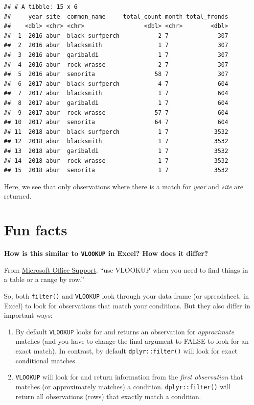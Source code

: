\documentclass[]{book}
\begin{document}
\begin{verbatim}
## # A tibble: 15 x 6
##     year site  common_name     total_count month total_fronds
##    <dbl> <chr> <chr>                 <dbl> <chr>        <dbl>
##  1  2016 abur  black surfperch           2 7              307
##  2  2016 abur  blacksmith                1 7              307
##  3  2016 abur  garibaldi                 1 7              307
##  4  2016 abur  rock wrasse               2 7              307
##  5  2016 abur  senorita                 58 7              307
##  6  2017 abur  black surfperch           4 7              604
##  7  2017 abur  blacksmith                1 7              604
##  8  2017 abur  garibaldi                 1 7              604
##  9  2017 abur  rock wrasse              57 7              604
## 10  2017 abur  senorita                 64 7              604
## 11  2018 abur  black surfperch           1 7             3532
## 12  2018 abur  blacksmith                1 7             3532
## 13  2018 abur  garibaldi                 1 7             3532
## 14  2018 abur  rock wrasse               1 7             3532
## 15  2018 abur  senorita                  1 7             3532
\end{verbatim}

Here, we see that only observations where there is a match for \emph{year} and \emph{site} are returned.

\hypertarget{fun-facts}{%
\section{Fun facts}\label{fun-facts}}

\textbf{How is this similar to \texttt{VLOOKUP} in Excel? How does it differ?}

From \href{https://support.office.com/en-us/article/vlookup-function-0bbc8083-26fe-4963-8ab8-93a18ad188a1}{Microsoft Office Support}, ``use VLOOKUP when you need to find things in a table or a range by row.''

So, both \texttt{filter()} and \texttt{VLOOKUP} look through your data frame (or spreadsheet, in Excel) to look for observations that match your conditions. But they also differ in important ways:

\begin{enumerate}
\def\labelenumi{(\arabic{enumi})}
\item
  By default \texttt{VLOOKUP} looks for and returns an observation for \emph{approximate} matches (and you have to change the final argument to FALSE to look for an exact match). In contrast, by default \texttt{dplyr::filter()} will look for exact conditional matches.
\item
  \texttt{VLOOKUP} will look for and return information from the \emph{first observation} that matches (or approximately matches) a condition. \texttt{dplyr::filter()} will return all observations (rows) that exactly match a condition.
\end{enumerate}
\end{document}

